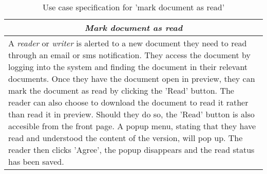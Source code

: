 \begin{table}[H]
\centering
\begin{tabular}{p{14.5cm}}
\hline
\multicolumn{1}{c}{\textit{\textbf{Mark document as read}}} \\
\hline
A \textit{reader} or \textit{writer} is alerted to a new document they need to read through an email or sms notification.
They access the document by logging into the system and finding the document in their relevant documents.
Once they have the document open in preview, they can mark the document as read by clicking the 'Read' button.
The reader can also choose to download the document to read it rather than read it in preview.
Should they do so, the 'Read' button is also accesible from the front page.
A popup menu, stating that they have read and understood the content of the version, will pop up.
The reader then clicks 'Agree', the popup disappears and the read status has been saved.
\\\hline
\end{tabular}
\caption{Use case specification for 'mark document as read'}\label{tab:mark-read}
\end{table}
